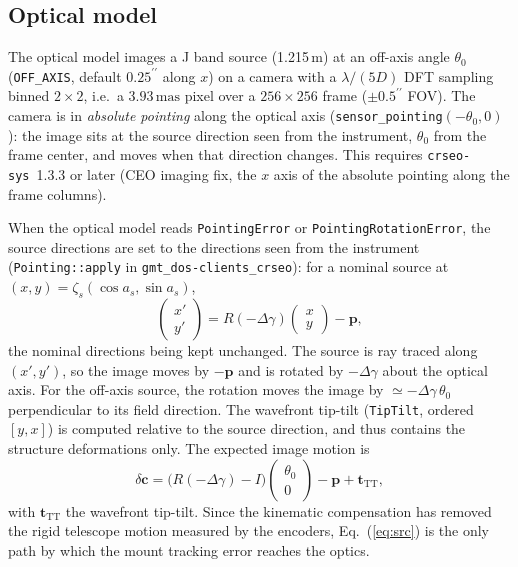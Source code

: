 \documentclass{gmto}
\numberwithin{table}{section}
\numberwithin{equation}{section}
\newcommand{\code}[1]{\texttt{#1}}
\newcommand{\mas}{\,\mathrm{mas}}
\newcommand{\arcsec}{^{\prime\prime}}
\newcommand{\vect}[1]{\boldsymbol{#1}}
\begin{document}
\subsection{Optical model}
\label{sec:pointing-om}

The optical model images a J band source (1.215\,\textmu m) at an off-axis angle $\theta_0$
(\code{OFF\_AXIS}, default $0.25\arcsec$ along $x$) on a camera with a $\lambda/(5D)$ DFT sampling
binned $2\times 2$, i.e.\ a $3.93\mas$ pixel over a $256\times 256$ frame ($\pm 0.5\arcsec$ FOV).
The camera is in \emph{absolute pointing} along the optical axis
(\code{sensor\_pointing}$(-\theta_0, 0)$): the image sits at the source direction seen from the
instrument, $\theta_0$ from the frame center, and moves when that direction changes.
This requires \code{crseo-sys}~1.3.3 or later (CEO imaging fix, the $x$ axis of the absolute pointing
along the frame columns).

When the optical model reads \code{PointingError} or \code{PointingRotationError}, the source
directions are set to the directions seen from the instrument
(\code{Pointing::apply} in \code{gmt\_dos-clients\_crseo}): for a nominal source at
$(x, y) = \zeta_s(\cos a_s, \sin a_s)$,
\begin{equation}
  \begin{pmatrix} x' \\ y' \end{pmatrix} =
  R(-\Delta\gamma)\begin{pmatrix} x \\ y \end{pmatrix} - \vect{p},
  \label{eq:src}
\end{equation}
the nominal directions being kept unchanged. The source is ray traced along $(x', y')$, so the image
moves by $-\vect{p}$ and is rotated by $-\Delta\gamma$ about the optical axis. For the off-axis source,
the rotation moves the image by $\simeq -\Delta\gamma\,\theta_0$ perpendicular to its field
direction. The wavefront tip-tilt (\code{TipTilt}, ordered $[y, x]$) is computed relative to the
source direction, and thus contains the structure deformations only. The expected image motion is
\begin{equation}
  \delta\vect{c} = \big(R(-\Delta\gamma) - I\big)\begin{pmatrix}\theta_0\\0\end{pmatrix}
  - \vect{p} + \vect{t}_{\mathrm{TT}},
  \label{eq:expected}
\end{equation}
with $\vect{t}_{\mathrm{TT}}$ the wavefront tip-tilt.
Since the kinematic compensation has removed the rigid telescope motion measured by the encoders,
Eq.~(\ref{eq:src}) is the only path by which the mount tracking error reaches the optics.
\end{document}
